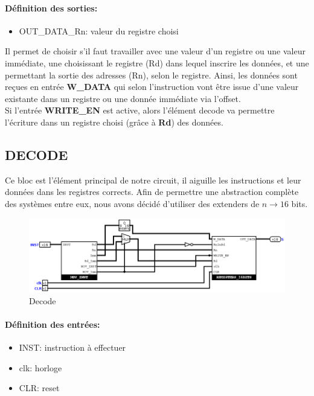 \documentclass[a4paper]{article} %
\begin{document}
\paragraph{Définition des sorties:}
\begin{itemize}
    \item OUT\_DATA\_Rn: valeur du registre choisi
\end{itemize}

\medskip
Il permet de choisir s'il faut travailler avec une valeur d'un registre ou une valeur immédiate, une choisissant le registre (Rd) dans lequel inscrire les données, et une permettant la sortie des adresses (Rn), selon le registre.
Ainsi, les données sont reçues en entrée \textbf{W\_DATA} qui selon l'instruction vont être issue d'une valeur existante dans un registre ou une donnée immédiate via l'offset. 
\\Si l'entrée \textbf{WRITE\_EN} est active, alors l'élément decode va permettre l'écriture dans un registre choisi (grâce à \textbf{Rd}) des données.


\subsection{DECODE}
Ce bloc est l'élément principal de notre circuit, il aiguille les instructions et leur données dans les registres corrects.
Afin de permettre une abstraction complète des systèmes entre eux, nous avons décidé d'utiliser des extenders de $n \rightarrow 16$ bits.\\
\begin{figure}[H]
    \centering
    \includegraphics[width=1\textwidth]{src/DECODE.png}
    \caption{Decode}
    \label{decode_img}
\end{figure}

\paragraph{Définition des entrées:}
\begin{itemize}
    \item     INST: instruction à effectuer
    \item     clk: horloge
    \item     CLR: reset
\end{itemize}
\end{document}

